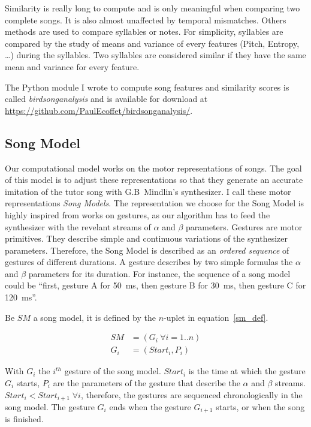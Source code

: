 \documentclass{report}
\begin{document}
Similarity is really long to compute and is only meaningful when comparing two
complete songs. It is also almost unaffected by temporal mismatches. Others
methods are used to compare syllables or notes. For simplicity, syllables are
compared by the study of means and variance of every features (Pitch, Entropy,
\ldots{}) during the syllables. Two syllables are considered similar if they
have the same mean and variance for every feature.

The Python module I wrote to compute song features and similarity scores is
called \emph{birdsonganalysis} and is available for download at
\url{https://github.com/PaulEcoffet/birdsonganalysis/}.

\subsection{Song Model}\label{song-model}

Our computational model works on the motor representations of songs. The goal of
this model is to adjust these representations so that they generate an accurate
imitation of the tutor song with G.B~Mindlin's synthesizer. I call these motor
representations \emph{Song Models}. The representation we choose for the Song
Model is highly inspired from \textcite{amador_elemental_2013} works on
gestures, as our algorithm has to feed the synthesizer with the revelant streams
of \(\alpha\) and \(\beta\) parameters. Gestures are motor primitives. They
describe simple and continuous variations of the synthesizer parameters.
Therefore, the Song Model is described as an \emph{ordered sequence} of gestures
of different durations. A gesture describes by two simple formulas the
\(\alpha\) and \(\beta\) parameters for its duration. For instance, the sequence
of a song model could be ``first, gesture A for 50~ms, then gesture B for 30~ms,
then gesture C for 120~ms''.

Be $SM$ a song model, it is defined by the $n$-uplet in equation~\ref{sm_def}.

\begin{align}
  SM &= (G_i\ \forall i = 1..n) \label{sm_def} \\
  G_i &= (Start_i, P_i)
\end{align}

With $G_i$ the $i^{th}$ gesture of the song model. $Start_i$ is the time at
which the gesture $G_i$ starts, $P_i$ are the parameters of the gesture that
describe the \(\alpha\) and \(\beta\) streams. \(Start_i < Start_{i+1} \;\forall
i\), therefore, the gestures are sequenced chronologically in the song model.
The gesture $G_i$ ends when the gesture $G_{i+1}$ starts, or when the song is
finished.
\end{document}
